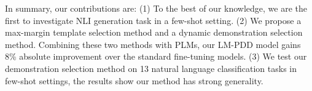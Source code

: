 In summary, our contributions are:
(1) To the best of our knowledge, we are the first to investigate NLI generation task in a few-shot setting.
(2) We propose a max-margin template selection method and a dynamic 
demonstration selection method. Combining these two methods with PLMs, 
our LM-PDD model gains 8\% absolute improvement over the standard fine-tuning models.
(3) We test our demonstration selection method on 
13 natural language classification tasks in few-shot settings, 
the results show our method has strong generality.

